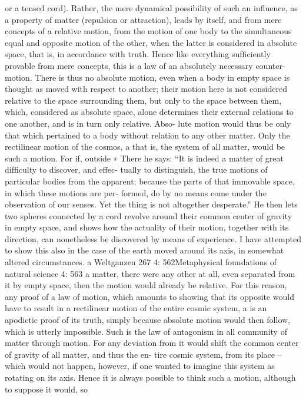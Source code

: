 or a tensed cord). Rather, the mere dynamical possibility of such an
inﬂuence, as a property of matter (repulsion or attraction), leads by itself,
and from mere concepts of a relative motion, from the motion of one
body to the simultaneous equal and opposite motion of the other, when
the latter is considered in absolute space, that is, in accordance with
truth. Hence like everything sufﬁciently provable from mere concepts,
this is a law of an absolutely necessary counter-motion.
There is thus no absolute motion, even when a body in empty space
is thought as moved with respect to another; their motion here is not
considered relative to the space surrounding them, but only to the space
between them, which, considered as absolute space, alone determines
their external relations to one another, and is in turn only relative. Abso-
lute motion would thus be only that which pertained to a body without
relation to any other matter. Only the rectilinear motion of the cosmos, a
that is, the system of all matter, would be such a motion. For if, outside
∗ There he says: “It is indeed a matter of great difﬁculty to discover, and effec-
tually to distinguish, the true motions of particular bodies from the apparent;
because the parts of that immovable space, in which these motions are per-
formed, do by no means come under the observation of our senses. Yet the
thing is not altogether desperate.” He then lets two spheres connected by a
cord revolve around their common center of gravity in empty space, and shows
how the actuality of their motion, together with its direction, can nonetheless
be discovered by means of experience. I have attempted to show this also in the
case of the earth moved around its axis, in somewhat altered circumstances.
a Weltganzen
267
4: 562Metaphysical foundations of natural science
4: 563
a matter, there were any other at all, even separated from it by empty
space, then the motion would already be relative. For this reason, any
proof of a law of motion, which amounts to showing that its opposite
would have to result in a rectilinear motion of the entire cosmic system, a
is an apodictic proof of its truth, simply because absolute motion would
then follow, which is utterly impossible. Such is the law of antagonism
in all community of matter through motion. For any deviation from it
would shift the common center of gravity of all matter, and thus the en-
tire cosmic system, from its place – which would not happen, however,
if one wanted to imagine this system as rotating on its axis. Hence it is
always possible to think such a motion, although to suppose it would, so
